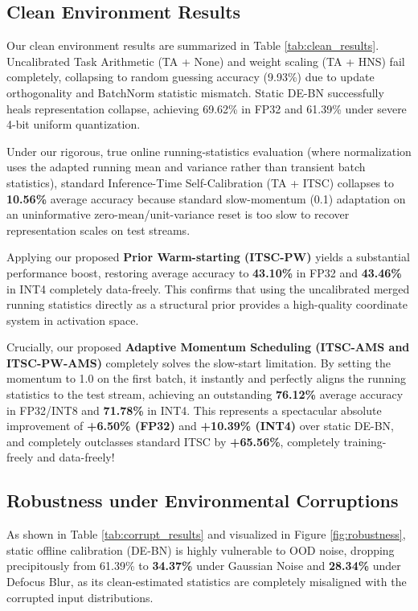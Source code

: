 \documentclass{article}
\theoremstyle{plain}
\theoremstyle{definition}
\theoremstyle{remark}
\begin{document}
\subsection{Clean Environment Results}
Our clean environment results are summarized in Table \ref{tab:clean_results}. Uncalibrated Task Arithmetic (TA + None) and weight scaling (TA + HNS) fail completely, collapsing to random guessing accuracy (9.93\%) due to update orthogonality and BatchNorm statistic mismatch. Static DE-BN successfully heals representation collapse, achieving 69.62\% in FP32 and 61.39\% under severe 4-bit uniform quantization. 

Under our rigorous, true online running-statistics evaluation (where normalization uses the adapted running mean and variance rather than transient batch statistics), standard Inference-Time Self-Calibration (TA + ITSC) collapses to \textbf{10.56\%} average accuracy because standard slow-momentum (0.1) adaptation on an uninformative zero-mean/unit-variance reset is too slow to recover representation scales on test streams.

Applying our proposed \textbf{Prior Warm-starting (ITSC-PW)} yields a substantial performance boost, restoring average accuracy to \textbf{43.10\%} in FP32 and \textbf{43.46\%} in INT4 completely data-freely. This confirms that using the uncalibrated merged running statistics directly as a structural prior provides a high-quality coordinate system in activation space.

Crucially, our proposed \textbf{Adaptive Momentum Scheduling (ITSC-AMS and ITSC-PW-AMS)} completely solves the slow-start limitation. By setting the momentum to 1.0 on the first batch, it instantly and perfectly aligns the running statistics to the test stream, achieving an outstanding \textbf{76.12\%} average accuracy in FP32/INT8 and \textbf{71.78\%} in INT4. This represents a spectacular absolute improvement of \textbf{+6.50\% (FP32)} and \textbf{+10.39\% (INT4)} over static DE-BN, and completely outclasses standard ITSC by \textbf{+65.56\%}, completely training-freely and data-freely!

\subsection{Robustness under Environmental Corruptions}
As shown in Table \ref{tab:corrupt_results} and visualized in Figure \ref{fig:robustness}, static offline calibration (DE-BN) is highly vulnerable to OOD noise, dropping precipitously from 61.39\% to \textbf{34.37\%} under Gaussian Noise and \textbf{28.34\%} under Defocus Blur, as its clean-estimated statistics are completely misaligned with the corrupted input distributions.
\end{document}
